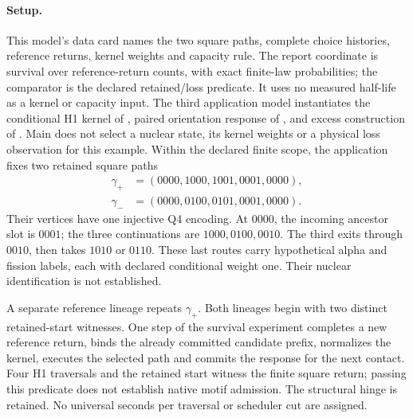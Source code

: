 \paragraph{Setup.}
This model's data card names the two square paths, complete choice histories,
reference returns, kernel weights and capacity rule. The report coordinate is
survival over reference-return counts, with exact finite-law probabilities;
the comparator is the declared retained/loss predicate. It uses no measured
half-life as a kernel or capacity input.
The third application model instantiates the conditional H1 kernel of
, paired orientation response of
, and excess construction of
. Main does not select a nuclear state, its kernel weights
or a physical loss observation for this example. Within the declared finite scope, the
application fixes two retained square paths
\begin{align}
\gamma_+&=(0000,1000,1001,0001,0000),\\
\gamma_-&=(0000,0100,0101,0001,0000).
\label{eq:manual2-survival-paths}
\end{align}
Their vertices have one injective Q4 encoding. At \(0000\), the incoming ancestor slot
is \(0001\); the three continuations are \(1000,0100,0010\). The third exits through
\(0010\), then takes \(1010\) or \(0110\). These last routes carry hypothetical alpha
and fission labels, each with declared conditional weight one. Their nuclear identification
is not established.

A separate reference lineage repeats \(\gamma_+\). Both lineages begin with two distinct
retained-start witnesses. One step of the survival experiment completes a new reference
return, binds the already committed candidate prefix, normalizes the kernel, executes the
selected path and commits the response for the next contact. Four H1 traversals and the
retained start witness the finite square return; passing this predicate does not establish
native motif admission. The structural hinge is retained. No universal seconds per
traversal or scheduler cut are assigned.

